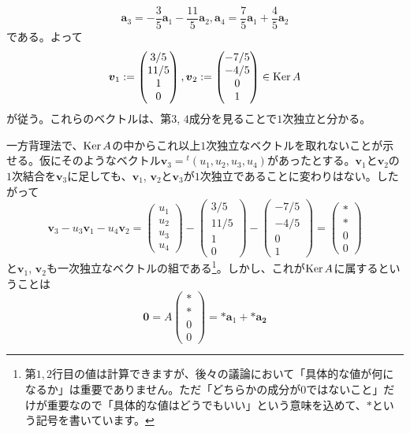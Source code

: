 \[
\bm{a}_3 = -\frac{3}{5} \bm{a}_1 -\frac{11}{5} \bm{a}_2, 
\bm{a}_4 = \frac{7}{5} \bm{a}_1 + \frac{4}{5} \bm{a}_2
\]
である。よって
\[
\boldsymbol{v}_1 :=
\begin{pmatrix}
3/5 \\
11/5 \\
1 \\
0
\end{pmatrix}, 
\boldsymbol{v}_2 :=
\begin{pmatrix}
-7/5 \\
-4/5 \\
0 \\
1
\end{pmatrix}
\in \operatorname{Ker} A
\]
が従う。これらのベクトルは、第$3$, $4$成分を見ることで$1$次独立と分かる。

一方背理法で、$\operatorname{Ker} A$の中からこれ以上$1$次独立なベクトルを取れないことが示せる。仮にそのようなベクトル$\bm{v}_3 = {}^t(u_1, u_2, u_3, u_4)$があったとする。$\bm{v}_1$と$\bm{v}_2$の$1$次結合を$\bm{v}_3$に足しても、$\bm{v}_1$, $\bm{v}_2$と$\bm{v}_3$が$1$次独立であることに変わりはない。したがって
\[
\bm{v}_3 - u_3 \bm{v}_1 - u_4 \bm{v}_2 = 
\begin{pmatrix}
u_1 \\
u_2 \\
u_3 \\
u_4
\end{pmatrix}
-
\begin{pmatrix}
3/5 \\
11/5 \\
1 \\
0
\end{pmatrix}
-
\begin{pmatrix}
-7/5 \\
-4/5 \\
0 \\
1
\end{pmatrix}
=
\begin{pmatrix}
* \\
* \\
0 \\
0
\end{pmatrix}
\]
と$\bm{v}_1$, $\bm{v}_2$も一次独立なベクトルの組である\footnote{第$1, 2$行目の値は計算できますが、後々の議論において「具体的な値が何になるか」は重要でありません。ただ「どちらかの成分が$0$ではないこと」だけが重要なので「具体的な値はどうでもいい」という意味を込めて、$*$という記号を書いています。}。しかし、これが$\operatorname{Ker} A$に属するということは
\[
\bm{0}
=
A
\begin{pmatrix}
* \\
* \\
0 \\
0
\end{pmatrix}
=
{*\bm{a}_1} + {*\bm{a_2}}
\]

